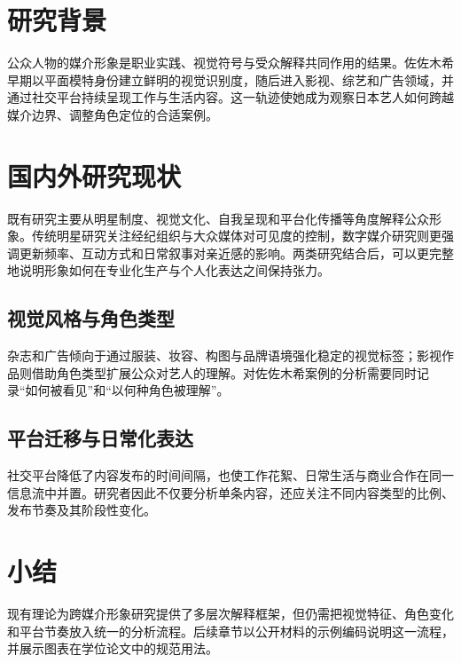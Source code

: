 
\section{研究背景}

公众人物的媒介形象是职业实践、视觉符号与受众解释共同作用的结果。佐佐木希早期以平面模特身份建立鲜明的视觉识别度，随后进入影视、综艺和广告领域，并通过社交平台持续呈现工作与生活内容。这一轨迹使她成为观察日本艺人如何跨越媒介边界、调整角色定位的合适案例。

\section{国内外研究现状}

既有研究主要从明星制度、视觉文化、自我呈现和平台化传播等角度解释公众形象。传统明星研究关注经纪组织与大众媒体对可见度的控制，数字媒介研究则更强调更新频率、互动方式和日常叙事对亲近感的影响。两类研究结合后，可以更完整地说明形象如何在专业化生产与个人化表达之间保持张力。

\subsection{视觉风格与角色类型}

杂志和广告倾向于通过服装、妆容、构图与品牌语境强化稳定的视觉标签；影视作品则借助角色类型扩展公众对艺人的理解。对佐佐木希案例的分析需要同时记录“如何被看见”和“以何种角色被理解”。

\subsection{平台迁移与日常化表达}

社交平台降低了内容发布的时间间隔，也使工作花絮、日常生活与商业合作在同一信息流中并置。研究者因此不仅要分析单条内容，还应关注不同内容类型的比例、发布节奏及其阶段性变化。

\section{小结}

现有理论为跨媒介形象研究提供了多层次解释框架，但仍需把视觉特征、角色变化和平台节奏放入统一的分析流程。后续章节以公开材料的示例编码说明这一流程，并展示图表在学位论文中的规范用法。
